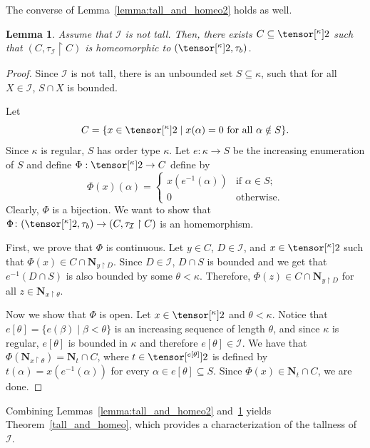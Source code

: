 \documentclass{amsart}
\numberwithin{equation}{section}
\newcommand{\I}{\mathcal{I}}
\newcommand{\pre}[2]{\tensor[^{#1}]{#2}{}}
\newcommand{\Nbhd}{\boldsymbol{N}}
\newcommand{\1}{\mathbf{I}}
\newcommand{\2}{\mathbf{II}}
\renewcommand{\b}{\beta}
\renewcommand{\k}{\kappa}
\newcommand{\clopen}[1]{\Nbhd_{#1}}
\newtheorem{lemma}[theorem]{Lemma}
\theoremstyle{definition}
\theoremstyle{remark}
\begin{document}
The converse of Lemma~\ref{lemma:tall_and_homeo2} holds as well. 

\begin{lemma}\label{lemma:tall_and_homeo1}
    Assume that \(\I\) is not tall. Then, there exists \(C \subseteq \pre{\k}{2}\) such that \((C, \tau_\I\restriction C)\) is homeomorphic to \((\pre{\k}{2}, \tau_b)\).
\end{lemma}
\begin{proof}
Since $\I$ is not tall, there is an unbounded set $S\subseteq \kappa$, such that for all $X\in \I$, $S\cap X$ is bounded.

    Let $$C=\{x\in \pre{\kappa}{2}\mid x(\alpha)=0\text{ for all }\alpha\notin S\}.$$
    Since $\kappa$ is regular, $S$ has order type $\kappa$. Let $e:\kappa\rightarrow S$ be the increasing enumeration of $S$ and define $\Phi: \pre{\k}{2}\rightarrow C$ define by 
    $$\Phi(x)(\alpha)=\begin{cases} x(e^{-1}(\alpha)) &\mbox{if }\alpha\in S;\\
    0 & 
    \text{otherwise.}\end{cases}$$  
    Clearly, $\Phi$ is a bijection. We want to show that $\Phi \colon (\pre{\k}{2}, \tau_b) \rightarrow (C, \tau_\I \restriction C)$ is an homemorphism. 
    
    First, we prove that \(\Phi\) is continuous. Let $y\in C$, $D\in \I$, and $x\in\pre{\kappa}{2}$ such that $\Phi(x)\in C\cap \clopen{y\restriction D}$. Since $D\in\I$, $D\cap S$ is bounded and we get that $e^{-1}(D\cap S)$ is also bounded by some $\theta<\kappa$.  Therefore, $\Phi(z)\in C\cap \clopen{y\restriction D}$ for all $z \in \clopen{x\restriction \theta}$.

    Now we show that \(\Phi\) is open. Let \(x \in \pre{\k}{2}\) and \(\theta<\k\). Notice that $e[\theta]=\{e(\b) \mid \b<\theta\} $ is an increasing sequence of length $\theta$, and since $\kappa$ is regular, \(e[\theta]\) is bounded in $\kappa$ and therefore $e[\theta]\in \I$. 
    We have that \(\Phi(\clopen{x \restriction \theta})=\clopen{t}\cap C\), where \(t \in \pre{e[\theta]}{2}\) is defined by \(t(\alpha)= x(e^{-1}(\alpha))\) for every \(\alpha\in e[\theta] \subseteq S\). 
    Since \(\Phi(x) \in \clopen{t} \cap C\), we are done.
\end{proof}

Combining Lemmas~\ref{lemma:tall_and_homeo2} and~\ref{lemma:tall_and_homeo1} yields Theorem~\ref{tall_and_homeo}, which provides a characterization of the tallness of \(\I\).
\end{document}
